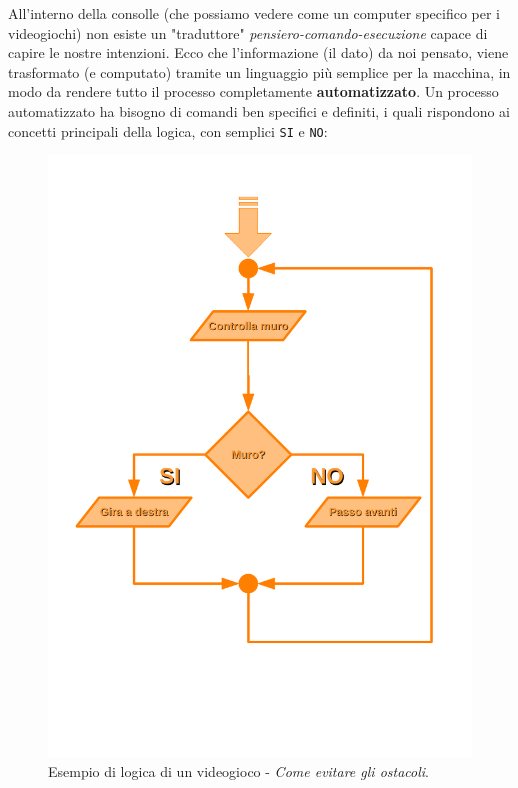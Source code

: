 \documentclass[11pt,fleqn,a5paper]{book} %
\begin{document}
    			All'interno della consolle (che possiamo vedere come un computer specifico per i videogiochi) non esiste un "traduttore" \textit{pensiero-comando-esecuzione} capace di capire le nostre intenzioni. Ecco che l'informazione (il dato) da noi pensato, viene trasformato (e computato) tramite un linguaggio più semplice per la macchina, in modo da rendere tutto il processo completamente \textbf{automatizzato}. Un processo automatizzato ha bisogno di comandi ben specifici e definiti, i quali rispondono ai concetti principali della logica, con semplici \texttt{SI} e \texttt{NO}:
    			\begin{figure}[h!]
    				\centering\includegraphics[scale=0.7]{Diagrams/diag1}
    				\caption{Esempio di logica di un videogioco - \textit{Come evitare gli ostacoli}.}
    			\end{figure}
    		
\end{document}
